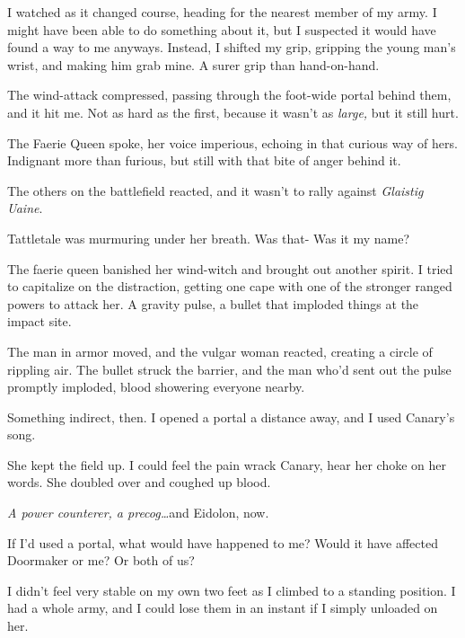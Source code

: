 I watched as it changed course, heading for the nearest member of my army.  I might have been able to do something about it, but I suspected it would have found a way to me anyways.  Instead, I shifted my grip, gripping the young man's wrist, and making him grab mine.  A surer grip than hand-on-hand.



The wind-attack compressed, passing through the foot-wide portal behind them, and it hit me.  Not as hard as the first, because it wasn't as\emph{ large, }but it still hurt.



The Faerie Queen spoke, her voice imperious, echoing in that curious way of hers.  Indignant more than furious, but still with that bite of anger behind it.



The others on the battlefield reacted, and it wasn't to rally against \emph{Glaistig Uaine}.



Tattletale was murmuring under her breath.  Was that-  Was it my name?



The faerie queen banished her wind-witch and brought out another spirit.  I tried to capitalize on the distraction, getting one cape with one of the stronger ranged powers to attack her.  A gravity pulse, a bullet that imploded things at the impact site.



The man in armor moved, and the vulgar woman reacted, creating a circle of rippling air.  The bullet struck the barrier, and the man who'd sent out the pulse promptly imploded, blood showering everyone nearby.



Something indirect, then.  I opened a portal a distance away, and I used Canary's song.



She kept the field up.  I could feel the pain wrack Canary, hear her choke on her words.  She doubled over and coughed up blood.



\emph{A power counterer, a precog\ldots  }and Eidolon, now.



If I'd used a portal, what would have happened to me?  Would it have affected Doormaker or me?  Or both of us?



I didn't feel very stable on my own two feet as I climbed to a standing position.  I had a whole army, and I could lose them in an instant if I simply unloaded on her.



